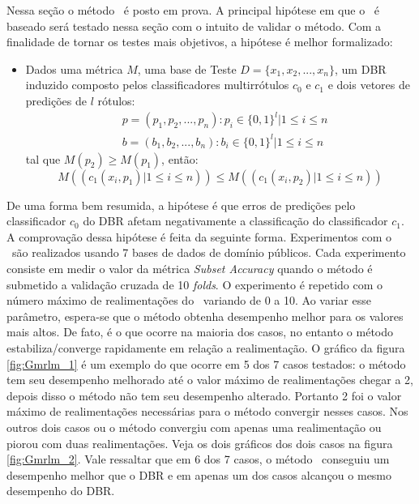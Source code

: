  Nessa seção o método \MRLMa~é posto em prova.
 A principal hipótese em que o \MRLMa~é baseado será testado nessa seção com o intuito de validar o método.
 Com a finalidade de tornar os testes mais objetivos, a hipótese é melhor formalizado:
 \begin{itemize}

  \item Dados uma métrica $M$, uma base de Teste $D=\{x_1,x_2,...,x_n\}$,
  um DBR induzido composto pelos classificadores multirrótulos $c_0$ e $c_1$ e
  dois vetores de predições de $l$ rótulos:
  \begin{equation}
  \begin{split}
  & p=(p_1,p_2,...,p_n) : p_i \in {\{0,1\}}^l |1 \leq i \leq n \\
  & b=(b_1,b_2,...,b_n) : b_i \in {\{0,1\}}^l |1 \leq i \leq n
  \end{split}
  \end{equation}
  tal que $M(p_2) \geq M(p_1)$,
  então:
  \begin{equation}
  M((c_1(x_i,p_1) | 1 \leq i \leq n)) \leq M((c_1(x_i,p_2) | 1 \leq i \leq n))
  \end{equation}
 
 \end{itemize}

De uma forma bem resumida, a hipótese é que erros de predições pelo
classificador $c_0$ do DBR afetam negativamente a classificação do classificador $c_1$.
A comprovação dessa hipótese é feita da seguinte forma. Experimentos com o \MRLMa~são realizados
usando 7 bases de dados de domínio públicos. Cada experimento consiste em medir o valor da métrica \textit{Subset Accuracy}
quando o método é submetido a validação cruzada de 10 \textit{folds}.
O experimento é repetido com o número máximo de realimentações do
\MRLMa~variando de 0 a 10. Ao variar esse parâmetro, espera-se que o método obtenha desempenho melhor para os valores mais altos.
De fato, é o que ocorre na maioria dos casos, no entanto o método estabiliza/converge rapidamente em relação a realimentação.
O gráfico da figura \ref{fig:Gmrlm_1} é um exemplo do que ocorre em 5 dos 7 casos testados: o método tem seu desempenho melhorado
até o valor máximo de realimentações chegar a 2, depois disso o método não tem seu desempenho alterado.
Portanto 2 foi o valor máximo de realimentações necessárias para o método convergir nesses casos.
Nos outros dois casos ou o método convergiu com apenas uma realimentação ou piorou 
com duas realimentações. Veja os dois gráficos dos dois casos na figura \ref{fig:Gmrlm_2}.
Vale ressaltar que em 6 dos 7 casos, o método \MRLMa~conseguiu um desempenho melhor que o DBR e em apenas um dos casos
alcançou o mesmo desempenho do DBR.




